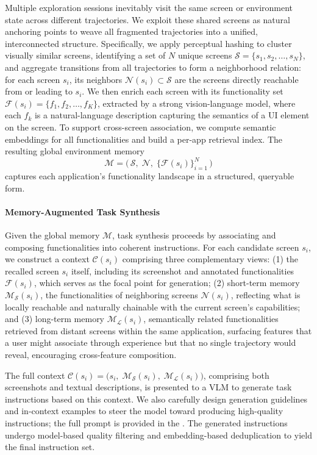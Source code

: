 \documentclass{article} %
\begin{document}
Multiple exploration sessions inevitably visit the same screen or environment state across different trajectories.
We exploit these shared screens as natural anchoring points to weave all fragmented trajectories into a unified, interconnected structure.
Specifically, we apply perceptual hashing to cluster visually similar screens, identifying a set of $N$ unique screens $\mathcal{S} = \{s_1, s_2, \ldots, s_N\}$, and aggregate transitions from all trajectories to form a neighborhood relation: for each screen $s_i$, its neighbors $\mathcal{N}(s_i) \subset \mathcal{S}$ are the screens directly reachable from or leading to $s_i$.
We then enrich each screen with its functionality set $\mathcal{F}(s_i) = \{f_1, f_2, \ldots, f_K\}$, extracted by a strong vision-language model, where each $f_k$ is a natural-language description capturing the semantics of a UI element on the screen.
To support cross-screen association, we compute semantic embeddings for all functionalities and build a per-app retrieval index.
The resulting global environment memory
\[
\mathcal{M} = \big(\,\mathcal{S},\;\mathcal{N},\;\{\mathcal{F}(s_i)\}_{i=1}^{N}\,\big)
\]
captures each application's functionality landscape in a structured, queryable form.

\paragraph{Memory-Augmented Task Synthesis}

Given the global memory $\mathcal{M}$, task synthesis proceeds by associating and composing functionalities into coherent instructions.
For each candidate screen $s_i$, we construct a context $\mathcal{C}(s_i)$ comprising three complementary views:
(1) the recalled screen $s_i$ itself, including its screenshot and annotated functionalities $\mathcal{F}(s_i)$, which serves as the focal point for generation;
(2) short-term memory $\mathcal{M_S}(s_i)$, the functionalities of neighboring screens $\mathcal{N}(s_i)$, reflecting what is locally reachable and naturally chainable with the current screen's capabilities;
and (3) long-term memory $\mathcal{M_L}(s_i)$, semantically related functionalities retrieved from distant screens within the same application, surfacing features that a user might associate through experience but that no single trajectory would reveal, encouraging cross-feature composition.

The full context $\mathcal{C}(s_i) = \big(s_i,\;\mathcal{M_S}(s_i),\;\mathcal{M_L}(s_i)\big)$, comprising both screenshots and textual descriptions, is presented to a VLM to generate task instructions based on this context.
We also carefully design generation guidelines and in-context examples to steer the model toward producing high-quality instructions; the full prompt is provided in the .
The generated instructions undergo model-based quality filtering and embedding-based deduplication to yield the final instruction set.
\end{document}
